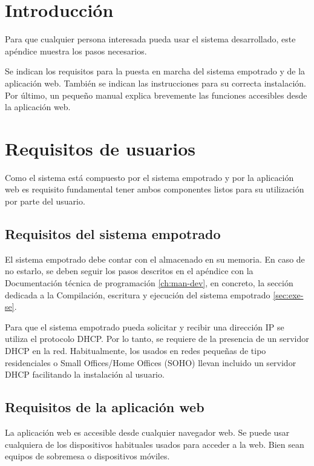 \label{ch:man-user}



\section{Introducción} \label{sec:man-user-intro}
Para que cualquier persona interesada pueda usar el sistema desarrollado,
este apéndice muestra los pasos necesarios.

Se indican los requisitos para la puesta en marcha del sistema empotrado
y de la aplicación web. También se indican las instrucciones para su correcta
instalación. Por último, un pequeño manual explica brevemente las funciones
accesibles desde la aplicación web.



\section{Requisitos de usuarios} \label{sec:man-user-req}
Como el sistema está compuesto por el sistema empotrado y por la aplicación web
es requisito fundamental tener ambos componentes listos para su utilización
por parte del usuario.


\subsection{Requisitos del sistema empotrado} \label{sec:man-user-req-se}
El sistema empotrado debe contar con el \sw{} almacenado en su memoria. En caso
de no estarlo, se deben seguir los pasos descritos en el apéndice con la
Documentación técnica de programación \ref{ch:man-dev}, en concreto, la sección
dedicada a la Compilación, escritura y ejecución del sistema empotrado
\ref{sec:exe-se}.


Para que el sistema empotrado pueda solicitar y recibir una dirección IP se
utiliza el protocolo DHCP. Por lo tanto, se requiere de la presencia de un
servidor DHCP en la red. Habitualmente, los  usados
en redes pequeñas de tipo residenciales o Small Offices/Home Offices (SOHO)
llevan incluido un servidor DHCP facilitando la instalación al usuario.


\subsection{Requisitos de la aplicación web} \label{sec:man-user-req-aw}
La aplicación web es accesible desde cualquier navegador web. Se puede usar
cualquiera de los dispositivos habituales usados para acceder a la web. Bien
sean equipos de sobremesa o dispositivos móviles.

